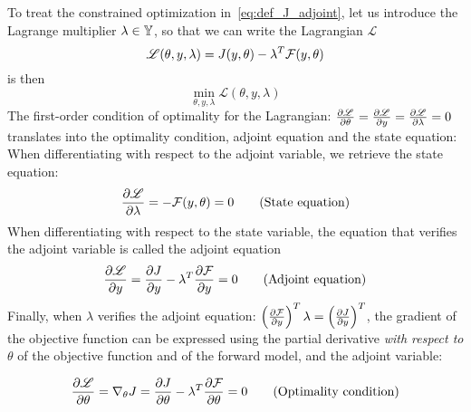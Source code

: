 \documentclass[../../Main_ManuscritThese.tex]{subfiles}
\begin{document}
To treat the constrained optimization in~\cref{eq:def_J_adjoint}, let us introduce the Lagrange multiplier $\lambda \in \mathbb{Y}$, so that we can write the Lagrangian $\mathscr{L}$
\begin{equation}
  \mathscr{L}(\theta, y, \lambda) = J(y,\theta) - \lambda^T \mathcal{F}(y, \theta)
\end{equation}
 is then
\begin{equation}
  \min_{\theta,y,\lambda} \mathscr{L}(\theta,y,\lambda)
\end{equation}
The first-order condition of optimality for the Lagrangian: $\frac{\partial \mathscr{L}}{\partial \theta} = \frac{\partial \mathscr{L}}{\partial y} = \frac{\partial \mathscr{L}}{\partial \lambda} = 0$ translates into the optimality condition, adjoint equation and the state equation:
When differentiating with respect to the adjoint variable, we retrieve the state equation:
\begin{equation}
  \frac{\partial \mathscr{L}}{\partial \lambda} = - \mathcal{F}(y,\theta) = 0 \tag{State equation}
\end{equation}
When differentiating with respect to the state variable, the equation that verifies the adjoint variable is called the adjoint equation
\begin{equation}
  \frac{\partial \mathscr{L}}{\partial y} = \frac{\partial J}{\partial y} - \lambda^T \frac{\partial \mathcal{F}}{\partial y}= 0  \tag{Adjoint equation}
\end{equation}
Finally, when $\lambda$ verifies the adjoint equation: $ \left(\frac{\partial \mathcal{F}}{\partial y}\right)^T\lambda= \left(\frac{\partial J}{\partial y}\right)^T$, the gradient of the objective function can be expressed using the partial derivative \emph{with respect to $\theta$} of the objective function and of the forward model, and the adjoint variable:

\begin{equation}
    \pfrac{\mathscr{L}}{\theta} = \nabla_\theta J %
                               = \pfrac{J}{\theta} - \innerprod{\lambda}{\pfrac{\mathcal{F}}{\theta}} = 0 \tag{Optimality condition}
\end{equation}
\end{document}
